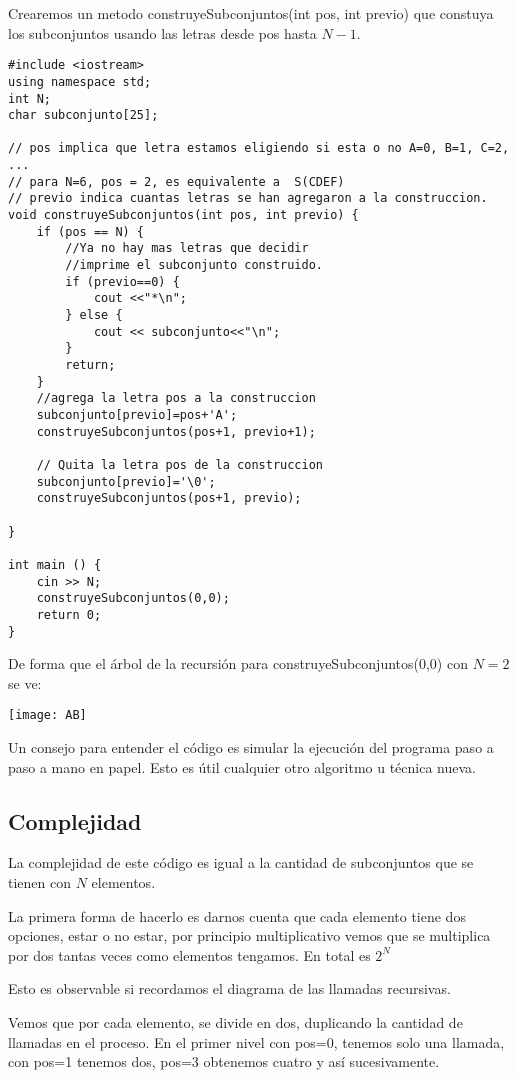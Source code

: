 Crearemos un metodo construyeSubconjuntos(int pos, int previo) que constuya los subconjuntos usando las letras desde pos hasta \(N-1\).
\pagebreak
\begin{lstlisting}
#include <iostream>
using namespace std;
int N;
char subconjunto[25];

// pos implica que letra estamos eligiendo si esta o no A=0, B=1, C=2, ...
// para N=6, pos = 2, es equivalente a  S(CDEF)
// previo indica cuantas letras se han agregaron a la construccion.
void construyeSubconjuntos(int pos, int previo) {
	if (pos == N) {
		//Ya no hay mas letras que decidir
		//imprime el subconjunto construido.
		if (previo==0) {
			cout <<"*\n";
		} else {
			cout << subconjunto<<"\n"; 
		}
		return;
	}
	//agrega la letra pos a la construccion
	subconjunto[previo]=pos+'A'; 
	construyeSubconjuntos(pos+1, previo+1); 
	
	// Quita la letra pos de la construccion
	subconjunto[previo]='\0'; 
	construyeSubconjuntos(pos+1, previo); 
	
}

int main () {
	cin >> N;
	construyeSubconjuntos(0,0);
	return 0;
}
\end{lstlisting}


De forma que el árbol de la recursión para construyeSubconjuntos(0,0) con \(N=2\) se ve:

 \begin{center}
	\texttt{[image: AB]}
\end{center} 

Un consejo para entender el código es simular la ejecución del programa paso a paso a mano en papel. Esto es útil cualquier otro algoritmo u técnica nueva.

\subsection*{Complejidad}
La complejidad de este código es igual a la cantidad de subconjuntos que se tienen con \(N\) elementos.

La primera forma de hacerlo es darnos cuenta que cada elemento tiene dos opciones, estar o no estar, por principio multiplicativo vemos que se multiplica por dos tantas veces como elementos tengamos. En total es \(2^N\) 

Esto es observable si recordamos el diagrama de las llamadas recursivas.

Vemos que por cada elemento, se divide en dos, duplicando la cantidad de llamadas en el proceso. En el primer nivel con pos=0, tenemos solo una llamada, con pos=1 tenemos dos, pos=3 obtenemos cuatro y así sucesivamente.

